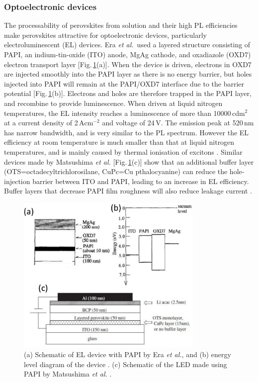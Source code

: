 \subsubsection{Optoelectronic devices}
The processability of perovskites from solution and their high PL efficiencies make perovskites attractive for optoelectronic devices, particularly electroluminescent (EL) devices. Era \textit{et al.}\ used a layered structure consisting of PAPI, an indium-tin-oxide (ITO) anode, MgAg cathode, and oxadiazole (OXD7) electron transport layer [Fig.\,\ref{2Fig22}(a)]. When the device is driven, electrons in OXD7 are injected smoothly into the PAPI layer as there is no energy barrier, but holes injected into PAPI will remain at the PAPI/OXD7 interface due to the barrier potential [Fig.\,\ref{2Fig22}(b)]. Electrons and holes are therefore trapped in the PAPI layer, and recombine to provide luminescence. When driven at liquid nitrogen temperatures, the EL intensity reaches a luminescence of more than 10000\,cd$\textrm{m}^2$ at a current density of 2\,A$\textrm{cm}^{-2}$ and voltage of 24\,V. The emission peak at 520\,nm has narrow bandwidth, and is very similar to the PL spectrum. However the EL efficiency at room temperature is much smaller than that at liquid nitrogen temperatures, and is mainly caused by thermal ionisation of excitons \cite{Era1994}. Similar devices made by Matsushima \textit{et al.} [Fig.\,\ref{2Fig22}(c)] show that an additional buffer layer (OTS=octadecyltrichlorosilane, CuPc=Cu pthalocyanine) can reduce the hole-injection barrier between ITO and PAPI, leading to an increase in EL efficiency. Buffer layers that decrease PAPI film roughness will also reduce leakage current \cite{Matsushima2005}.
\begin{figure}[h!]
\centering
\includegraphics[width=0.8\textwidth]{Fig22}
\caption{(a) Schematic of EL device with PAPI by Era \textit{et al.}, and (b) energy level diagram of the device \cite{Era1994}. (c) Schematic of the LED made using PAPI by Matsushima \textit{et al.} \cite{Matsushima2005}.}
\label{2Fig22}
\end{figure}

